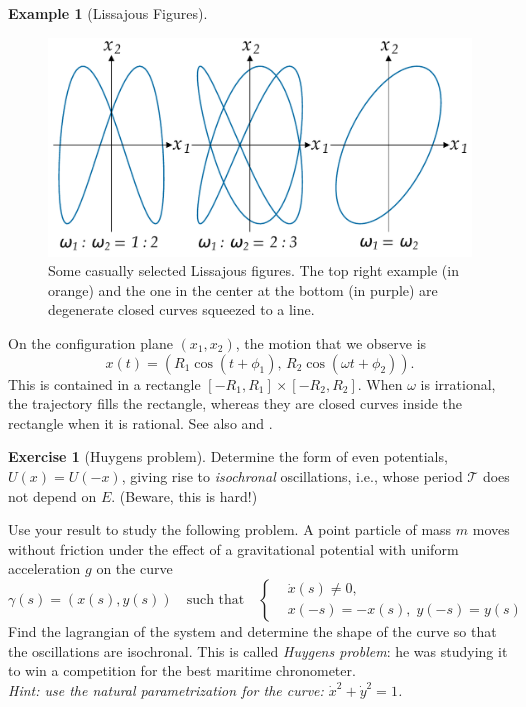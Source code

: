 \documentclass[english,fontsize=11pt,paper=b5]{scrbook}
\numberwithin{equation}{chapter}
\theoremstyle{definition}
\newtheorem{example}{Example}[chapter]
\newtheorem{exercise}{Exercise}[chapter]
\begin{document}
\begin{example}[Lissajous Figures]
      \begin{figure}[ht]
        \centering
        \includegraphics[width=.75\linewidth,trim={0 50pt 0 50pt},clip]{images/lissajous.pdf}
        \caption{Some casually selected Lissajous figures. The top right example (in orange) and the one in the center at the bottom (in purple) are degenerate closed curves squeezed to a line.}
        \label{img:lissajous}
      \end{figure}

      On the configuration plane $(x_1, x_2)$, the motion that we observe is
      \begin{equation}
        x(t) = \left( R_1 \cos(t + \phi_1),\, R_2 \cos(\omega t + \phi_2) \right).
      \end{equation}
      This is contained in a rectangle $[-R_1,R_1]\times[-R_2,R_2]$. When $\omega$ is irrational, the trajectory fills the rectangle, whereas they are closed curves inside the rectangle when it is rational.
      See also \cite[Exercise 6.34]{book:knauf} and \cite[Chapter 2.5, Example 2]{book:arnold}.
    \end{example}

    \begin{exercise}[Huygens problem]
      Determine the form of even potentials, $U(x) = U(-x)$, giving rise to \emph{isochronal} oscillations, i.e., whose period $\mathcal{T}$ does not depend on $E$. (Beware, this is hard!)

      Use your result to study the following problem.
      A point particle of mass $m$ moves without friction under the effect of a gravitational potential with uniform acceleration $g$ on the curve
      \begin{equation}
        \gamma(s) = (x(s), y(s)) \quad\mbox{such that}\quad
        \left\lbrace
          \begin{aligned}
       & \dot x(s) \neq 0,              \\
       & x(-s) = -x(s), \; y(-s) = y(s)
          \end{aligned}
        \right.
      \end{equation}
      Find the lagrangian of the system and determine the shape of the curve so that the oscillations are isochronal.
      This is called \emph{Huygens problem}: he was studying it to win a competition for the best maritime chronometer.\\
      \textit{Hint: use the natural parametrization for the curve: $\dot x^2 + \dot y^2 = 1$.}
    \end{exercise}
\end{document}
